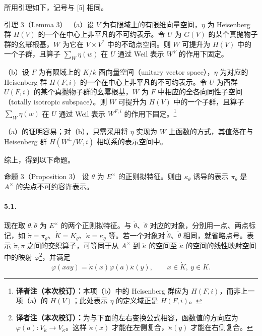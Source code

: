 所用引理如下，记号与 [5] 相同。
\begin{originaltheorem}{引理 3（Lemma 3）}
（a）设 $V$ 为有限域上的有限维向量空间，$\eta$ 为 Heisenberg 群 $H(V)$ 的一个在中心上非平凡的不可约表示。令 $U$ 为 $G(V)$ 的某个真抛物子群的幺幂根基，$W$ 为它在 $V\times V^*$ 中的不动点空间。则 $W$ 可提升为 $H(V)$ 中的一个子群，且算子 $\sum_W\eta(w)$ 在 $U$ 通过 Weil 表示 $W^V$ 的作用下固定。

（b）设 $F$ 为有限域上的 $K/k$ 酉向量空间（unitary vector space），$\eta$ 为对应的 Heisenberg 群 $H(F,i)$ 的一个在中心上非平凡的不可约表示。令 $U$ 为酉群 $U(F,i)$ 的某个真抛物子群的幺幂根基，$W$ 为 $F$ 中相应的全各向同性子空间（totally isotropic subspace）。则 $W$ 可提升为 $H(V)$ 中的一个子群，且算子 $\sum_W\eta(w)$ 在 $U$ 通过 Weil 表示 $W^{F,i}$ 的作用下固定。\footnote{\textbf{译者注（本次校订）：}本项（b）中的 Heisenberg 群应为 $H(F,i)$，而非上一项（a）的 $H(V)$；此处表示 $\eta$ 的定义域正是 $H(F,i)$。}
\end{originaltheorem}
（a）的证明容易；对（b），只需采用将 $\eta$ 实现为 $W$ 上函数的方式，其值落在与 Heisenberg 群 $H(W^\perp/W,i)$ 相联系的表示空间中。

综上，得到以下命题。
\begin{originaltheorem}{命题 3（Proposition 3）}
设 $\theta$ 为 $E^\times$ 的正则拟特征。则由 $\kappa_\theta$ 诱导的表示 $\pi_\theta$ 是 $A^\times$ 的尖点不可约容许表示。
\end{originaltheorem}

\paragraph*{5.1.}现在取 $\dot\theta,\ddot\theta$ 为 $E^\times$ 的两个正则拟特征。与 $\dot\theta$、$\ddot\theta$ 对应的对象，分别用一点、两点标记，如 $\dot\pi=\pi_{\dot\theta}$、$\dot K=K_{\dot\theta}$、$\dot\kappa=\kappa_{\dot\theta}$ 等。若一个对象对 $\dot\theta$、$\ddot\theta$ 相同，就省略点号。表示 $\dot\pi,\ddot\pi$ 之间的交织算子，可等同于从 $A^\times$ 到 $\dot\kappa$ 的空间至 $\ddot\kappa$ 的空间的线性映射空间中的映射 $\varphi$\footnote{\textbf{译者注（本次校订）：}为与下面的左右变换公式相容，函数值的方向应为 $\varphi(a):V_{\ddot\kappa}\to V_{\dot\kappa}$。这样 $\dot\kappa(x)$ 才能在左侧复合，$\ddot\kappa(y)$ 才能在右侧复合。}，并满足
\[
\varphi(xay)=\dot\kappa(x)\varphi(a)\ddot\kappa(y),\qquad x\in\dot K,\ y\in\ddot K.
\]
